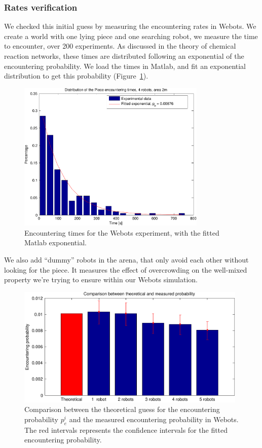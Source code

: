 	\subsubsection{Rates verification} %
	\label{ssub:rates_verification}
		We checked this initial guess by measuring the encountering rates in Webots. We create a world with one lying piece and one searching robot, we measure the time to encounter, over 200 experiments. As discussed in the theory of chemical reaction networks, these times are distributed following an exponential of the encountering probability. We load the times in Matlab, and fit an exponential distribution to get this probability (Figure~\ref{fig:img_encountering_exp_fitting}).
		\begin{figure}[h]
			\centering
				\includegraphics[width=9cm]{img/encountering_exp_fitting.pdf}
			\caption{Encountering times for the Webots experiment, with the fitted Matlab exponential.}
			\label{fig:img_encountering_exp_fitting}
		\end{figure}
		
		We also add ``dummy'' robots in the arena, that only avoid each other without looking for the piece. It measures the effect of overcrowding on the well-mixed property we're trying to ensure within our Webots simulation.
		
		\begin{figure}[h]
			\centering
				\includegraphics[width=11cm]{img/encounteringrate_withrobots.pdf}
			\caption{Comparison between the theoretical guess for the encountering probability $p_e^i$ and the measured encountering probability in Webots. The red intervals represents the confidence intervals for the fitted encountering probability.}
			\label{fig:img_encounteringrate_withrobots}
		\end{figure}
		
